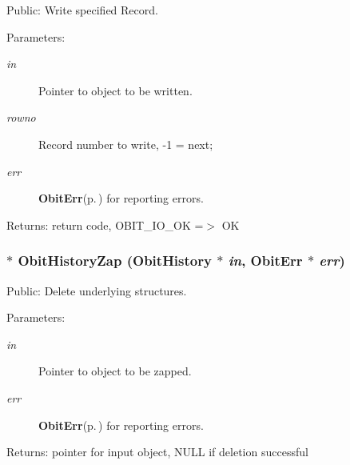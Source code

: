 Public: Write specified Record. 

\begin{Desc}
\item[Parameters:]
\begin{description}
\item[{\em in}]Pointer to object to be written. \item[{\em rowno}]Record number to write, -1 = next; \item[{\em err}]{\bf Obit\-Err}{\rm (p.\,\pageref{structObitErr})} for reporting errors. \end{description}
\end{Desc}
\begin{Desc}
\item[Returns:]return code, OBIT\_\-IO\_\-OK =$>$ OK \end{Desc}
\subsubsection{$\ast$ Obit\-History\-Zap ({\bf Obit\-History} $\ast$ {\em in}, {\bf Obit\-Err} $\ast$ {\em err})}\label{ObitHistory_8c_a10}


Public: Delete underlying structures. 

\begin{Desc}
\item[Parameters:]
\begin{description}
\item[{\em in}]Pointer to object to be zapped. \item[{\em err}]{\bf Obit\-Err}{\rm (p.\,\pageref{structObitErr})} for reporting errors. \end{description}
\end{Desc}
\begin{Desc}
\item[Returns:]pointer for input object, NULL if deletion successful \end{Desc}
